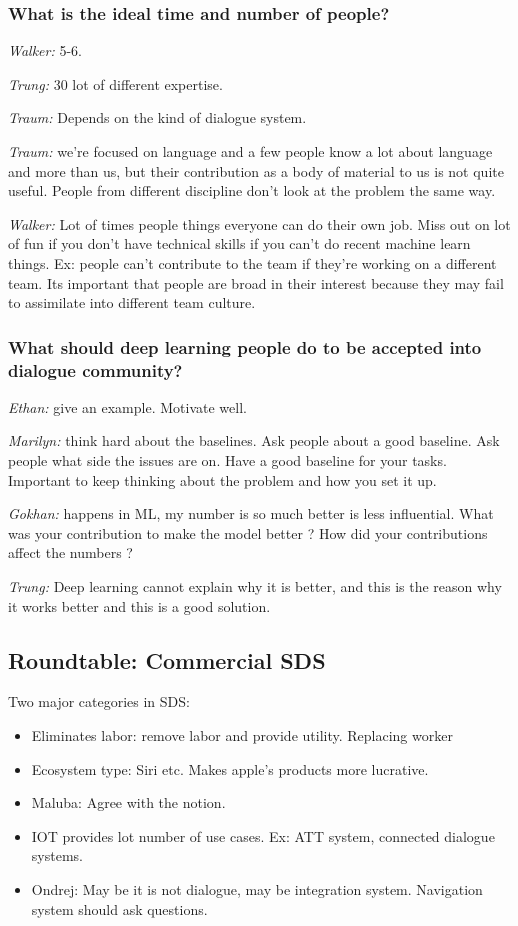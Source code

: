 \documentclass[12pt]{article}
\begin{document}
\subsubsection*{What is the ideal time and number of people?}

{\it Walker:} 5-6.

{\it Trung:} 30 lot of different expertise.

{\it Traum:} Depends on the kind of dialogue system.

{\it Traum:} we’re focused on language and a few people know a lot about language and more than us, but their contribution as a body of material to us is not quite useful. People from different discipline don’t look at the problem the same way.

{\it Walker:} Lot of times people things everyone can do their own job. Miss out on lot of fun if you don’t have technical skills if you can’t do recent machine learn things. Ex: people can’t contribute to the team if they’re working on a different team. Its important that people are broad in their interest because they may fail to assimilate into different team culture.

\subsubsection*{What should deep learning people do to be accepted into dialogue community?}

{\it Ethan:} give an example. Motivate well.

{\it Marilyn:} think hard about the baselines. Ask people about a good baseline. Ask people what side the issues are on. Have a good baseline for your tasks. Important to keep thinking about the problem and how you set it up.

{\it Gokhan:} happens in ML, my number is so much better is less influential. What was your contribution to make the model better ? How did your contributions affect the numbers ?

{\it Trung:} Deep learning cannot explain why it is better, and this is the reason why it works better and this is a good solution.

\subsection{Roundtable: Commercial SDS}

Two major categories in SDS:
\begin{itemize}
    \item Eliminates labor: remove labor and provide utility. Replacing worker
    \item Ecosystem type: Siri etc. Makes apple’s products more lucrative.
    \item Maluba: Agree with the notion.
    \item IOT provides lot number of use cases. Ex: ATT system, connected dialogue systems.
    \item Ondrej: May be it is not dialogue, may be integration system. Navigation system should ask questions.
\end{itemize}
\end{document}
